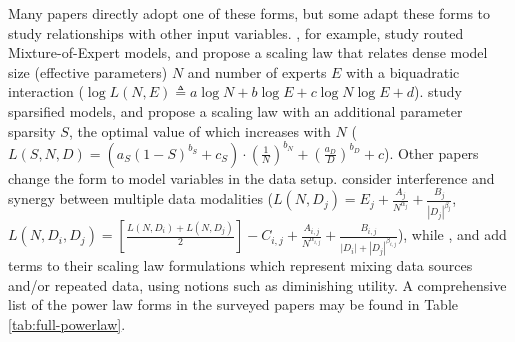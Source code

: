 Many papers directly adopt one of these forms, but some adapt these forms to study relationships with other input variables. \citet{clark2022unified}, for example, study routed Mixture-of-Expert models, and propose a scaling law that relates dense model size (effective parameters) $N$ and number of experts $E$ with a biquadratic interaction ($\log L(N, E) \triangleq a \log N+b \log E+c \log N \log E+d$). \citet{frantar2023scaling} study sparsified models, and propose a scaling law with an additional parameter sparsity $S$, the optimal value of which increases with $N$ ($L(S, N, D)=\left(a_S(1-S)^{b_S}+c_S\right) \cdot\left(\frac{1}{N}\right)^{b_N}+\left(\frac{a_D}{D}\right)^{b_D}+c$). Other papers change the form to model variables in the data setup. \citet{aghajanyan2023scaling} consider interference and synergy between multiple data modalities ($L(N, D_j)=E_j + \frac{A_j}{N^{\alpha_j}} + \frac{B_j}{|D_j|^{\beta_j}}$, $L(N, D_i, D_j) = [\frac{L(N, D_i) + L(N, D_j)}{2}] - C_{i,j} + \frac{A_{i,j}}{N^{\alpha_{i,j}}} + \frac{B_{i,j}}{|D_i|+|D_j|^{\beta_{i,j}}}$), while \cite{goyal2024scaling}, \citet{fernandes2023scaling} and \cite{muennighoff2024scaling} add terms to their scaling law formulations which represent mixing data sources and/or repeated data, using notions such as diminishing utility. A comprehensive list of the power law forms in the surveyed papers may be found in Table \ref{tab:full-powerlaw}.





